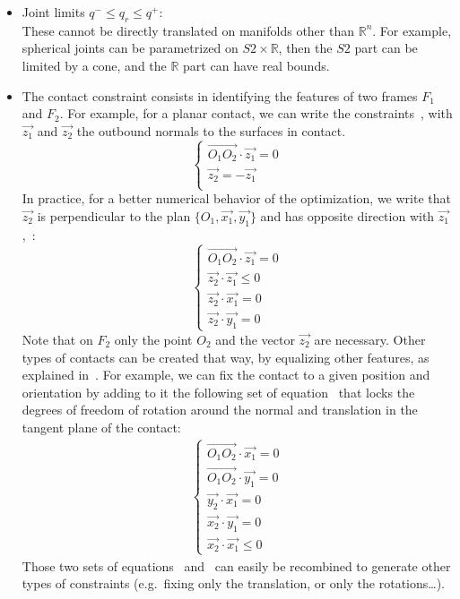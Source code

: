 \begin{itemize}
\item Joint limits ${q^-} \leq q_r \leq {q^+}$:\\
These cannot be directly translated on manifolds other than $\mathbb{R}^n$.
For example, spherical joints can be parametrized on $S2 \times \mathbb{R}$, then the $S2$ part can be limited by a cone, and the $\mathbb{R}$ part can have real bounds.

\item The contact constraint consists in identifying the features of two frames $F_1$ and $F_2$.
For example, for a planar contact, we can write the constraints~, with $\vec{z_1}$ and $\vec{z_2}$ the outbound normals to the surfaces in contact.
\begin{equation}
  \left\{
  \begin{array}{ll}
    \overrightarrow{O_1O_2}\cdot\vec{z_1} = 0\\
    \vec{z_2} = -\vec{z_1} \\
  \end{array}
  \right.
\label{eq:planar_contact_bad}
\end{equation}
In practice, for a better numerical behavior of the optimization, we write that $\vec{z_2}$ is perpendicular to the plan $\{O_1, \vec{x_1}, \vec{y_1}\}$ and has opposite direction with $\vec{z_1}$,~:
\begin{equation}
  \left\{
  \begin{array}{ll}
    \overrightarrow{O_1O_2}\cdot\vec{z_1} = 0\\
    \vec{z_2}\cdot\vec{z_1} \leq 0 \\
    \vec{z_2}\cdot\vec{x_1} = 0 \\
    \vec{z_2}\cdot\vec{y_1} = 0
  \end{array}
  \right.
\label{eq:planar_contact}
\end{equation}
Note that on $F_2$ only the point $O_2$ and the vector $\vec{z_2}$ are necessary.
Other types of contacts can be created that way, by equalizing other features, as explained in~\cite{escande:ras:2013}.
For example, we can fix the contact to a given position and orientation by adding to it the following set of equation~ that locks the degrees of freedom of rotation around the normal and translation in the tangent plane of the contact:
\begin{align}
  \left\{
  \begin{array}{ll}
    \overrightarrow{O_1O_2} \cdot \vec{x_1} = 0 \\
    \overrightarrow{O_1O_2} \cdot \vec{y_1} = 0 \\
    \vec{y_2} \cdot \vec{x_1} = 0 \\
    \vec{x_2} \cdot \vec{y_1} = 0 \\
    \vec{x_2} \cdot \vec{x_1} \leq 0
  \end{array}
  \right.
\label{eq:fix_planar_contact}
\end{align}
Those two sets of equations~ and~ can easily be recombined to generate other types of constraints (e.g.\ fixing only the translation, or only the rotations\ldots).


\end{itemize}
